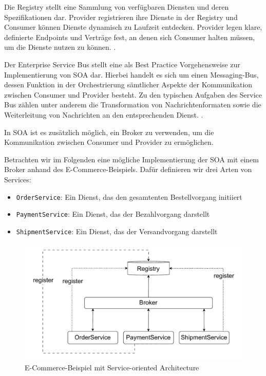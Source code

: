 \documentclass[acmtog]{acmart}
\begin{document}
Die Registry stellt eine Sammlung von verfügbaren Diensten und deren Spezifikationen dar.
Provider registrieren ihre Dienste in der Registry und Consumer können Dienste dynamisch zu Laufzeit entdecken.
Provider legen klare, definierte Endpoints und Verträge fest, an denen sich Consumer halten müssen,
um die Dienste nutzen zu können. \cite[23 - 24]{soa4}.

Der Enterprise Service Bus stellt eine als Best Practice Vorgehensweise zur Implementierung
von SOA dar. Hierbei handelt es sich um einen Messaging-Bus, dessen
Funktion in der Orchestrierung sämtlicher Aspekte der Kommunikation zwischen Consumer und Provider besteht.
Zu den typischen Aufgaben des Service Bus zählen unter anderem die Transformation von Nachrichtenformaten
sowie die Weiterleitung von Nachrichten an den entsprechenden Dienst.
\cite[37]{soa4}.

In SOA ist es zusätzlich möglich, ein Broker zu verwenden, um die Kommunikation zwischen
Consumer und Provider zu ermöglichen.\cite[2]{soa5}

Betrachten wir im Folgenden eine mögliche Implementierung der SOA mit einem Broker anhand des E-Commerce-Beispiels.
Dafür definieren wir drei Arten von Services:
\begin{itemize}
  \item \texttt{OrderService}: Ein Dienst, das den gesamtenten Bestellvorgang initiiert
  \item \texttt{PaymentService}: Ein Dienst, das der Bezahlvorgang darstellt
  \item \texttt{ShipmentService}: Ein Dienst, das der Versandvorgang darstellt
\end{itemize}

\begin{figure}[!h]
  \centering
  \includegraphics[width=0.8\linewidth]{images/soa/soa-example.pdf}
  \caption{E-Commerce-Beispiel mit Service-oriented Architecture}
  \label{fig:soaecommerce}
\end{figure}
\end{document}
